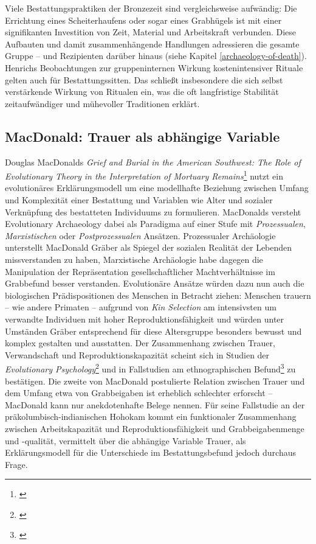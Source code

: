 \documentclass[openany,twoside,twocolumn]{book}
\let\rmarkdownfootnote\footnote%
\def\footnote{\protect\rmarkdownfootnote}
\begin{document}
Viele Bestattungspraktiken der Bronzezeit sind vergleichsweise aufwändig: Die Errichtung eines Scheiterhaufens oder sogar eines Grabhügels ist mit einer signifikanten Investition von Zeit, Material und Arbeitskraft verbunden. Diese Aufbauten und damit zusammenhängende Handlungen adressieren die gesamte Gruppe -- und Rezipienten darüber hinaus (siehe Kapitel \ref{archaeology-of-death}). Henrichs Beobachtungen zur gruppeninternen Wirkung kostenintensiver Rituale gelten auch für Bestattungssitten. Das schließt insbesondere die sich selbst verstärkende Wirkung von Ritualen ein, was die oft langfristige Stabilität zeitaufwändiger und mühevoller Traditionen erklärt.

\hypertarget{macdonald-trauer-als-abhangige-variable}{%
\subsection{MacDonald: Trauer als abhängige Variable}\label{macdonald-trauer-als-abhangige-variable}}

Douglas MacDonalds \emph{Grief and Burial in the American Southwest: The Role of Evolutionary Theory in the Interpretation of Mortuary Remains}\footnote{\textcite{macdonald_grief_2001}} nutzt ein evolutionäres Erklärungsmodell um eine modellhafte Beziehung zwischen Umfang und Komplexität einer Bestattung und Variablen wie Alter und sozialer Verknüpfung des bestatteten Individuums zu formulieren. MacDonalds versteht Evolutionary Archaeology dabei als Paradigma auf einer Stufe mit \emph{Prozessualen}, \emph{Marxistischen} oder \emph{Postprozessualen} Ansätzen. Prozessualer Archäologie unterstellt MacDonald Gräber als Spiegel der sozialen Realität der Lebenden missverstanden zu haben, Marxistische Archäologie habe dagegen die Manipulation der Repräsentation gesellschaftlicher Machtverhältnisse im Grabbefund besser verstanden. Evolutionäre Ansätze würden dazu nun auch die biologischen Prädispositionen des Menschen in Betracht ziehen: Menschen trauern -- wie andere Primaten -- aufgrund von \emph{Kin Selection} am intensivsten um verwandte Individuen mit hoher Reproduktionsfähigkeit und würden unter Umständen Gräber entsprechend für diese Altersgruppe besonders bewusst und komplex gestalten und ausstatten. Der Zusammenhang zwischen Trauer, Verwandschaft und Reproduktionskapazität scheint sich in Studien der \emph{Evolutionary Psychology}\footnote{\textcite{segal_grief_1993}} und in Fallstudien am ethnographischen Befund\footnote{\textcite{crawford_human_1989}} zu bestätigen. Die zweite von MacDonald postulierte Relation zwischen Trauer und dem Umfang etwa von Grabbeigaben ist erheblich schlechter erforscht -- MacDonald kann nur anekdotenhafte Belege nennen. Für seine Fallstudie an der präkolumbisch-indianischen Hohokam kommt ein funktionaler Zusammenhang zwischen Arbeitskapazität und Reproduktionsfähigkeit und Grabbeigabenmenge und -qualität, vermittelt über die abhängige Variable Trauer, als Erklärungsmodell für die Unterschiede im Bestattungsbefund jedoch durchaus Frage.
\end{document}
